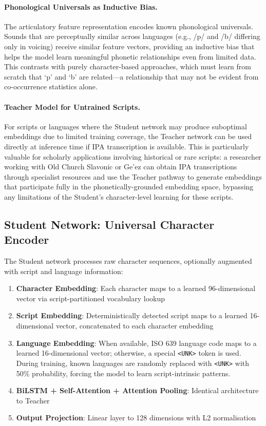 \documentclass[11pt,a4paper]{article}
\newcommand{\embdim}{128}
\begin{document}
\paragraph{Phonological Universals as Inductive Bias.} The articulatory feature representation encodes known phonological universals. Sounds that are perceptually similar across languages (e.g., /p/ and /b/ differing only in voicing) receive similar feature vectors, providing an inductive bias that helps the model learn meaningful phonetic relationships even from limited data. This contrasts with purely character-based approaches, which must learn from scratch that `p' and `b' are related---a relationship that may not be evident from co-occurrence statistics alone.

\paragraph{Teacher Model for Untrained Scripts.} For scripts or languages where the Student network may produce suboptimal embeddings due to limited training coverage, the Teacher network can be used directly at inference time if IPA transcription is available. This is particularly valuable for scholarly applications involving historical or rare scripts: a researcher working with Old Church Slavonic or Ge'ez can obtain IPA transcriptions through specialist resources and use the Teacher pathway to generate embeddings that participate fully in the phonetically-grounded embedding space, bypassing any limitations of the Student's character-level learning for these scripts.

\subsection{Student Network: Universal Character Encoder}

The Student network processes raw character sequences, optionally augmented with script and language information:

\begin{enumerate}
    \item \textbf{Character Embedding}: Each character maps to a learned 96-dimensional vector via script-partitioned vocabulary lookup
    \item \textbf{Script Embedding}: Deterministically detected script maps to a learned 16-dimensional vector, concatenated to each character embedding
    \item \textbf{Language Embedding}: When available, ISO 639 language code maps to a learned 16-dimensional vector; otherwise, a special \texttt{<UNK>} token is used. During training, known languages are randomly replaced with \texttt{<UNK>} with 50\% probability, forcing the model to learn script-intrinsic patterns.
    \item \textbf{BiLSTM + Self-Attention + Attention Pooling}: Identical architecture to Teacher
    \item \textbf{Output Projection}: Linear layer to \embdim{} dimensions with L2 normalisation
\end{enumerate}
\end{document}
